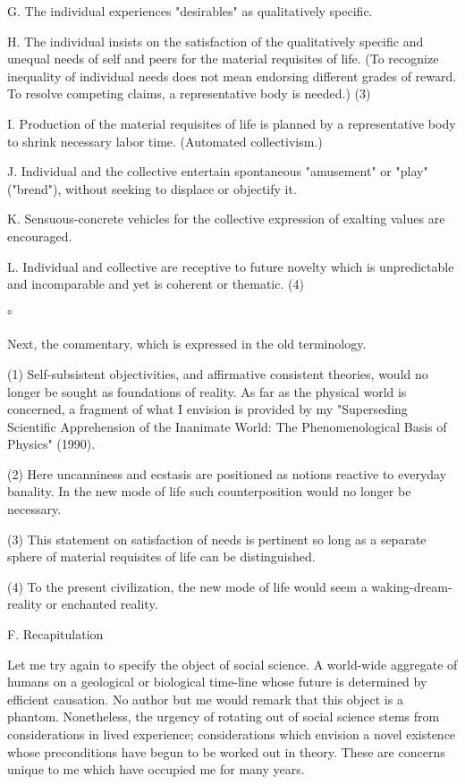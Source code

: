 \begin{enumerate}[label=\alph*.]
G. The individual experiences "desirables" as qualitatively specific.

H. The individual insists on the satisfaction of the qualitatively specific and unequal needs of self and peers for the material requisites of life. (To recognize inequality of individual needs does not mean endorsing different grades of reward. To resolve competing claims, a representative body is needed.) (3)

I. Production of the material requisites of life is planned by a representative body to shrink necessary labor time. (Automated collectivism.)

J. Individual and the collective entertain spontaneous "amusement" or "play" ("brend"), without seeking to displace or objectify it.

K. Sensuous-concrete vehicles for the collective expression of exalting values are encouraged.

L. Individual and collective are receptive to future novelty which is unpredictable and incomparable and yet is coherent or thematic. (4)

°

Next, the commentary, which is expressed in the old terminology.

(1) Self-subsistent objectivities, and affirmative consistent theories, would no longer be sought as foundations of reality. As far as the physical world is concerned, a fragment of what I envision is provided by my "Superseding Scientific Apprehension of the Inanimate World: The Phenomenological Basis of Physics" (1990).

(2) Here uncanniness and ecstasis are positioned as notions reactive to everyday banality. In the new mode of life such counterposition would no longer be necessary.

(3) This statement on satisfaction of needs is pertinent so long as a separate sphere of material requisites of life can be distinguished.

(4) To the present civilization, the new mode of life would seem a waking-dream-reality or enchanted reality.

\visbreak

F. Recapitulation

Let me try again to specify the object of social science. A world-wide aggregate of humans on a geological or biological time-line whose future is determined by efficient causation. No author but me would remark that this object is a phantom. Nonetheless, the urgency of rotating out of social science stems from considerations in lived experience; considerations which envision a novel existence whose preconditions have begun to be worked out in theory. These are concerns unique to me which have occupied me for many years.


\end{enumerate}
